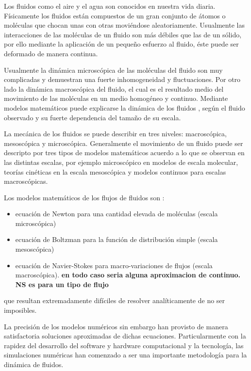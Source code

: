 Los fluidos como el aire y el agua son conocidos en nuestra vida diaria. Físicamente los fluidos están compuestos de un gran conjunto de átomos o moléculas que chocan unas con otras moviéndose  aleatoriamente. Usualmente las interacciones de las moléculas de un fluido son más débiles que las de un sólido, por ello mediante la aplicación de un pequeño esfuerzo al fluido, éste puede ser deformado de manera continua.


Usualmente la dinámica microscópica de las moléculas del fluido son muy complicadas y demuestran una fuerte inhomogeneidad y fluctuaciones.
Por otro lado la dinámica macroscópica del fluido, el cual es el resultado medio del movimiento de las moléculas en un medio homogéneo y continuo.
Mediante modelos matemáticos puede explicarse la dinámica de los fluidos , según el fluido observado y su fuerte dependencia del tamaño de su escala.

La mecánica de los fluidos se puede describir en tres niveles: macroscópica, mesoscópica y microscópica.
Generalmente el movimiento de un fluido puede ser descripto por tres tipos de modelos matemáticos acuerdo a lo que se observan en las distintas escalas, por ejemplo microscópico en modelos de escala molecular, teorías cinéticas en la escala mesoscópica y modelos continuos para escalas macroscópicas.


Los modelos matemáticos de los flujos de fluidos son :

\begin{itemize}
	\item ecuación de Newton para una cantidad elevada de moléculas (escala microscópica)
	\item ecuación de Boltzman para la función de distribución simple (escala mesoscópica)
	\item ecuación de Navier-Stokes para macro-variaciones de flujos (escala macroscópica). \textbf{en todo caso seria alguna aproximacion de continuo. NS es para un tipo de flujo}
\end{itemize}

que resultan extremadamente difíciles de resolver analíticamente de no ser imposibles.

 La precisión de los modelos numéricos sin embargo han provisto de manera satisfactoria soluciones aproximadas de dichas ecuaciones.
Particularmente con la rapidez del desarrollo del software y hardware computacional y la tecnología, las simulaciones numéricas han comenzado a ser una importante metodología para la dinámica de fluidos.

